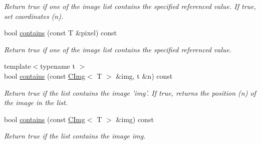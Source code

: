 \begin{DoxyCompactItemize}
\begin{DoxyCompactList}\small\item\em Return {\ttfamily true} if one of the image list contains the specified referenced value. If true, set coordinates (n). \item\end{DoxyCompactList}\item 
\hypertarget{structcimg__library_1_1CImgList_ac209cb1eac5d34a620140e1fb221605b}{
bool \hyperlink{structcimg__library_1_1CImgList_ac209cb1eac5d34a620140e1fb221605b}{contains} (const T \&pixel) const }
\label{structcimg__library_1_1CImgList_ac209cb1eac5d34a620140e1fb221605b}

\begin{DoxyCompactList}\small\item\em Return {\ttfamily true} if one of the image list contains the specified referenced value. \item\end{DoxyCompactList}\item 
\hypertarget{structcimg__library_1_1CImgList_a4e9bb42cccd3f39ecb7c9e0783e40e28}{
{\footnotesize template$<$typename t $>$ }\\bool \hyperlink{structcimg__library_1_1CImgList_a4e9bb42cccd3f39ecb7c9e0783e40e28}{contains} (const \hyperlink{structcimg__library_1_1CImg}{CImg}$<$ T $>$ \&img, t \&n) const }
\label{structcimg__library_1_1CImgList_a4e9bb42cccd3f39ecb7c9e0783e40e28}

\begin{DoxyCompactList}\small\item\em Return {\ttfamily true} if the list contains the image 'img'. If true, returns the position (n) of the image in the list. \item\end{DoxyCompactList}\item 
\hypertarget{structcimg__library_1_1CImgList_ac9db155d4cc5e0d066e9404cbef2f1eb}{
bool \hyperlink{structcimg__library_1_1CImgList_ac9db155d4cc5e0d066e9404cbef2f1eb}{contains} (const \hyperlink{structcimg__library_1_1CImg}{CImg}$<$ T $>$ \&img) const }
\label{structcimg__library_1_1CImgList_ac9db155d4cc5e0d066e9404cbef2f1eb}

\begin{DoxyCompactList}\small\item\em Return {\ttfamily true} if the list contains the image img. \item\end{DoxyCompactList}\end{DoxyCompactItemize}
